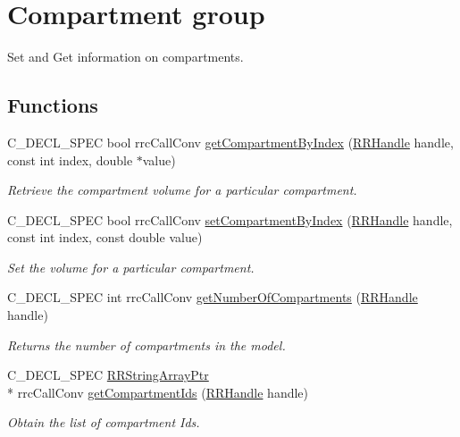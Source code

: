 \hypertarget{group__compartment}{\section{Compartment group}
\label{group__compartment}
}


Set and Get information on compartments.  


\subsection*{Functions}
\begin{DoxyCompactItemize}
\item 
C\-\_\-\-D\-E\-C\-L\-\_\-\-S\-P\-E\-C bool rrc\-Call\-Conv \hyperlink{group__compartment_ga4ed76bba681918dd733c0857c160c2cb}{get\-Compartment\-By\-Index} (\hyperlink{rrc__types_8h_a1d68f0592372208fa5a5f2799ea4b3ae}{R\-R\-Handle} handle, const int index, double $\ast$value)
\begin{DoxyCompactList}\small\item\em Retrieve the compartment volume for a particular compartment. \end{DoxyCompactList}\item 
C\-\_\-\-D\-E\-C\-L\-\_\-\-S\-P\-E\-C bool rrc\-Call\-Conv \hyperlink{group__compartment_ga8baaf727b28d0acc9fdb90ae5682e4d7}{set\-Compartment\-By\-Index} (\hyperlink{rrc__types_8h_a1d68f0592372208fa5a5f2799ea4b3ae}{R\-R\-Handle} handle, const int index, const double value)
\begin{DoxyCompactList}\small\item\em Set the volume for a particular compartment. \end{DoxyCompactList}\item 
C\-\_\-\-D\-E\-C\-L\-\_\-\-S\-P\-E\-C int rrc\-Call\-Conv \hyperlink{group__compartment_gadb42e920ac63aa0b1b6d6a6a9c6fd504}{get\-Number\-Of\-Compartments} (\hyperlink{rrc__types_8h_a1d68f0592372208fa5a5f2799ea4b3ae}{R\-R\-Handle} handle)
\begin{DoxyCompactList}\small\item\em Returns the number of compartments in the model. \end{DoxyCompactList}\item 
C\-\_\-\-D\-E\-C\-L\-\_\-\-S\-P\-E\-C \hyperlink{rrc__types_8h_a7c9475df6c7337d99482b13a365e7596}{R\-R\-String\-Array\-Ptr} \\*
rrc\-Call\-Conv \hyperlink{group__compartment_ga319aa6ee06a7150d35c87f8ed2c9ab8a}{get\-Compartment\-Ids} (\hyperlink{rrc__types_8h_a1d68f0592372208fa5a5f2799ea4b3ae}{R\-R\-Handle} handle)
\begin{DoxyCompactList}\small\item\em Obtain the list of compartment Ids. \end{DoxyCompactList}\end{DoxyCompactItemize}


